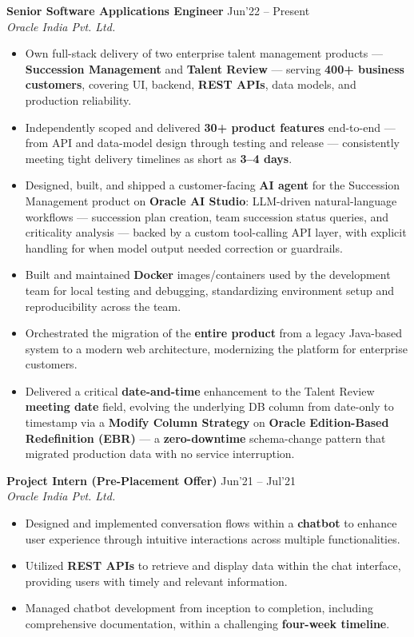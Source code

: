 \documentclass[10pt,a4paper]{article}
\newcommand{\resumeItem}[1]{\item[\textcolor{primary}{\textbullet}] #1}
\begin{document}
\textbf{Senior Software Applications Engineer} \hfill Jun'22 -- Present\\
\textit{Oracle India Pvt. Ltd.}
\begin{itemize}[leftmargin=1.05em, nosep, topsep=2pt, itemsep=2pt, parsep=0pt]
    \resumeItem{Own full-stack delivery of two enterprise talent management products --- \textbf{Succession Management} and \textbf{Talent Review} --- serving \textbf{400+ business customers}, covering UI, backend, \textbf{REST APIs}, data models, and production reliability.}
    \resumeItem{Independently scoped and delivered \textbf{30+ product features} end-to-end --- from API and data-model design through testing and release --- consistently meeting tight delivery timelines as short as \textbf{3--4 days}.}
    \resumeItem{Designed, built, and shipped a customer-facing \textbf{AI agent} for the Succession Management product on \textbf{Oracle AI Studio}: LLM-driven natural-language workflows --- succession plan creation, team succession status queries, and criticality analysis --- backed by a custom tool-calling API layer, with explicit handling for when model output needed correction or guardrails.}
    \resumeItem{Built and maintained \textbf{Docker} images/containers used by the development team for local testing and debugging, standardizing environment setup and reproducibility across the team.}
    \resumeItem{Orchestrated the migration of the \textbf{entire product} from a legacy Java-based system to a modern web architecture, modernizing the platform for enterprise customers.}
    \resumeItem{Delivered a critical \textbf{date-and-time} enhancement to the Talent Review \textbf{meeting date} field, evolving the underlying DB column from date-only to timestamp via a \textbf{Modify Column Strategy} on \textbf{Oracle Edition-Based Redefinition (EBR)} --- a \textbf{zero-downtime} schema-change pattern that migrated production data with no service interruption.}
\end{itemize}

\vspace{2pt}
\textbf{Project Intern (Pre-Placement Offer)} \hfill Jun'21 -- Jul'21\\
\textit{Oracle India Pvt. Ltd.}
\begin{itemize}[leftmargin=1.05em, nosep, topsep=2pt, itemsep=2pt, parsep=0pt]
    \resumeItem{Designed and implemented conversation flows within a \textbf{chatbot} to enhance user experience through intuitive interactions across multiple functionalities.}
    \resumeItem{Utilized \textbf{REST APIs} to retrieve and display data within the chat interface, providing users with timely and relevant information.}
    \resumeItem{Managed chatbot development from inception to completion, including comprehensive documentation, within a challenging \textbf{four-week timeline}.}
\end{itemize}
\end{document}
